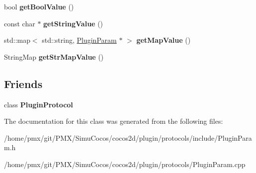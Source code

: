 \begin{DoxyCompactItemize}
bool {\bfseries get\+Bool\+Value} ()
\item 
\mbox{\label{classcocos2d_1_1plugin_1_1PluginParam_ab269214f019d5ce88e926e14bdfc02b4}} 
const char $\ast$ {\bfseries get\+String\+Value} ()
\item 
\mbox{\label{classcocos2d_1_1plugin_1_1PluginParam_afb1d4134eecae1d858e5a80db355de18}} 
std\+::map$<$ std\+::string, \hyperlink{classcocos2d_1_1plugin_1_1PluginParam}{Plugin\+Param} $\ast$ $>$ {\bfseries get\+Map\+Value} ()
\item 
\mbox{\label{classcocos2d_1_1plugin_1_1PluginParam_ab2530d50eb19890e002f7b9c917b10a8}} 
String\+Map {\bfseries get\+Str\+Map\+Value} ()
\end{DoxyCompactItemize}
\subsection*{Friends}
\begin{DoxyCompactItemize}
\item 
\mbox{\label{classcocos2d_1_1plugin_1_1PluginParam_ae45d009472753b1e8e47b47c05db6993}} 
class {\bfseries Plugin\+Protocol}
\end{DoxyCompactItemize}


The documentation for this class was generated from the following files\+:\begin{DoxyCompactItemize}
\item 
/home/pmx/git/\+P\+M\+X/\+Simu\+Cocos/cocos2d/plugin/protocols/include/Plugin\+Param.\+h\item 
/home/pmx/git/\+P\+M\+X/\+Simu\+Cocos/cocos2d/plugin/protocols/Plugin\+Param.\+cpp\end{DoxyCompactItemize}
